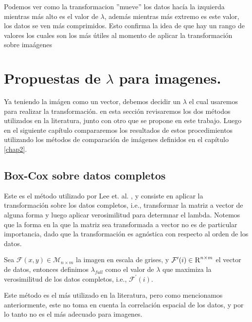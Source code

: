     Podemos ver como la transformacion ''mueve'' los datos hac\'ia la izquierda mientras m\'as alto es el valor de $\lambda$, adem\'as mientras m\'as extremo es este valor, los datos se ven m\'as comprimidos. Esto confirma la idea de que hay un rango de valores los cuales son los m\'as \'utiles al momento de aplicar la transformaci\'on sobre ima\'agenes



    \section[Propuestas de lambda]{Propuestas de $\lambda$ para imagenes.}\label{}


    Ya teniendo la im\'agen como un vector, debemos decidir un $\lambda$ el cual usaremos para realizar la transformaci\'on. en esta secci\'on revisaremos los dos m\'etodos utilizados en la literatura, junto con otro que se propone en este trabajo. Luego en el siguiente cap\'itulo compararemos los resultados de estos procedimientos utilizando los m\'etodos de comparaci\'on de im\'agenes definidos en el cap\'itulo \ref{chap2}.


    \subsection{Box-Cox sobre datos completos}

    Este es el m\'etodo utilizado por Lee et. al. \cite{lee2009mr}, y consiste en aplicar la transformaci\'on sobre los datos completos, i.e., transformar la matriz a vector de alguna forma y luego aplicar verosimilitud para determnar el lambda. Notemos que la forma en la que la matriz sea transformada a vector no es de particular importancia, dado que la transformaci\'on es agn\'ostica con respecto al orden de los datos. 

    \begin{defn}\label{lambda_full}
        Sea $\mathcal{F}(x, y)\in\mathcal{M}_{n\times m}$ la imagen en escala de grises, y $\mathcal{F}^{\prime}(i)\in\textsc{R}^{n\times m}$ el vector de datos, entonces definimos $\lambda_{full}$ como el valor de $\lambda$ que maximiza la verosimilitud de los datos completos, i.e., $\mathcal{F}^{\prime}(i)$.
    \end{defn}
    
    Este m\'etodo es el m\'as utilizado en la literatura, pero como mencionamos anteriormente, este no toma en cuenta la correlaci\'on espacial de los datos, y por lo tanto no es el m\'as adecuado para imagenes. 



